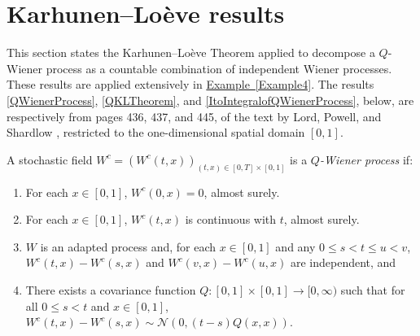 \documentclass[onefignum]{siamart250211}
\begin{document}













\section{Karhunen--Lo\`eve results}\label{AppendixSPDE}

This section states the Karhunen--Lo\`eve Theorem applied to decompose a $Q$-Wiener process as a countable combination of independent Wiener processes. These results are applied extensively in \hyperref[Example4]{Example~\ref*{Example4}}. The results \cref{QWienerProcess}, \cref{QKLTheorem}, and \cref{ItoIntegralofQWienerProcess}, below, are respectively from pages 436, 437, and 445, of the text by Lord, Powell, and Shardlow \cite{LordPowellShardlow2014}, restricted to the one-dimensional spatial domain $[0,1]$.

\begin{definition}\label{QWienerProcess}A stochastic field $W^c=(W^c(t,x))_{(t,x)\in[0,T]\times[0,1]}$ is a \emph{$Q$-Wiener process} if:
\begin{enumerate}
  \item For each $x\in[0,1]$, $W^c(0,x)=0$, almost surely.
  \item For each $x\in[0,1]$, $W^c(t,x)$ is continuous with $t$, almost surely.
  \item $W$ is an adapted process and, for each $x\in[0,1]$ and any $0\leqslant s<t\leqslant u<v$, $W^c(t,x)-W^c(s,x)$ and $W^c(v,x)-W^c(u,x)$ are independent, and
  \item There exists a covariance function $Q:[0,1]\times[0,1]\to[0,\infty)$ such that for all $0\leqslant s<t$ and $x\in[0,1]$, $W^c(t,x)-W^c(s,x)\sim\mathcal{N}(0,(t-s)Q(x,x))$.
\end{enumerate}
\end{definition}
\end{document}
